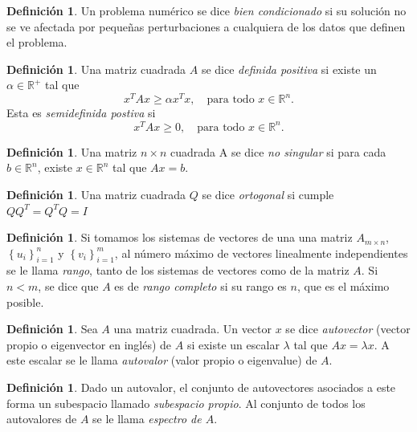 \documentclass[11pt,a4paper]{book}
\theoremstyle{definition}
\newtheorem{definition}[theorem]{Definición}
\theoremstyle{remark}
\newcommand{\sucesion}[1]{\left\{#1\right\}}
\begin{document}
\begin{definition}
	Un problema numérico se dice \textit{bien condicionado} si su solución no se ve afectada por pequeñas perturbaciones a cualquiera de los datos que definen el problema.
\end{definition}

\begin{definition}
	Una matriz cuadrada $A$ se dice \textit{definida positiva} si existe un $\alpha \in \mathbb{R}^+$ tal que
	\begin{equation}
		x^TAx \geq \alpha x^T x, \quad \text{para todo } x \in \mathbb{R}^n.
	\end{equation}
	Esta es \textit{semidefinida postiva} si
	\begin{equation}
		x^TAx \geq 0, \quad \text{para todo } x \in \mathbb{R}^n.
	\end{equation}
\end{definition}

\begin{definition}
	Una matriz $n \times n$ cuadrada A se dice \textit{no singular} si para cada $b \in \mathbb{R}^n$, existe $x\in\mathbb{R}^n$ tal que $Ax=b$.
\end{definition}

\begin{definition}
	Una matriz cuadrada $Q$ se dice \textit{ortogonal} si cumple $QQ^T=Q^TQ=I$
\end{definition}

\begin{definition}
	Si tomamos los sistemas de vectores de una una matriz $A_{m \times n}$, $\sucesion{u_i}_{i=1}^n$ y $\sucesion{v_i}_{i=1}^m$, al número máximo de vectores linealmente independientes se le llama \textit{rango}, tanto de los sistemas de vectores como de la matriz $A$. Si $n<m$, se dice que $A$ es de \textit{rango completo} si su rango es $n$, que es el máximo posible.
\end{definition}

\begin{definition}
	Sea $A$ una matriz cuadrada. Un vector $x$ se dice \textit{autovector} (vector propio o
	eigenvector en inglés) de $A$ si existe un
	escalar $\lambda$ tal que $Ax=\lambda x$. A este escalar se le llama \textit{autovalor} 
	(valor propio o eigenvalue) de $A$.
\end{definition}	
\begin{definition}
	Dado un autovalor, el conjunto de autovectores asociados
	a este forma un subespacio llamado \textit{subespacio propio}.
	Al conjunto de todos los autovalores de $A$ se le llama \textit{espectro de $A$}.
\end{definition}
\end{document}
